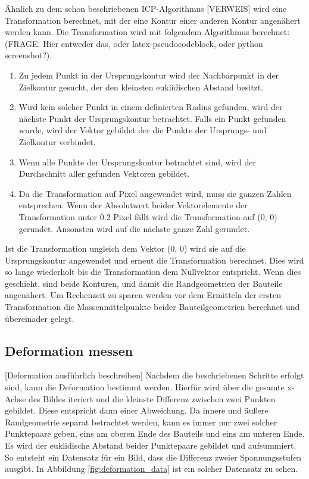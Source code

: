 Ähnlich zu dem schon beschriebenen ICP-Algorithmus [VERWEIS] wird eine Transformation berechnet,
mit der eine Kontur einer anderen Kontur angenähert werden kann.
Die Transformation wird mit folgendem Algorithmus berechnet:
(FRAGE: Hier entweder das, oder latex-pseudocodeblock, oder python screenshot?).

\begin{enumerate}
    \item Zu jedem Punkt in der Ursprungskontur wird der Nachbarpunkt
    in der Zielkontur gesucht, der den kleinsten euklidischen Abstand besitzt.
    \item Wird kein solcher Punkt in einem definierten Radius gefunden,
    wird der nächste Punkt der Ursprungskontur
    betrachtet. Falls ein Punkt gefunden wurde, wird der Vektor gebildet der die Punkte
    der Ursprungs- und Zielkontur verbindet.
    \item Wenn alle Punkte der Ursprungskontur betrachtet sind, wird der 
    Durchschnitt aller gefunden Vektoren gebildet.
    \item Da die Transformation auf Pixel angewendet wird, muss sie ganzen Zahlen 
    entsprechen. Wenn der Absolutwert beider Vektorelemente der Transformation 
    unter 0.2 Pixel fällt wird die Transformation auf (0, 0) gerundet.
    Ansonsten wird auf die nächste ganze Zahl gerundet.
\end{enumerate}

Ist die Transformation ungleich dem Vektor (0, 0) wird sie auf die Ursprungskontur 
angewendet und erneut die Transformation berechnet. Dies wird so lange wiederholt bis 
die Transformation dem Nullvektor entspricht. Wenn dies geschieht, sind beide Konturen, 
und damit die Randgeometrien der Bauteile angenähert.
Um Rechenzeit zu sparen werden vor dem Ermitteln der ersten Transformation die 
Massenmittelpunkte beider Bauteilgeometrien berechnet und übereinader gelegt.

\subsection{Deformation messen}

[Deformation ausführlich beschreiben]
Nachdem die beschriebenen Schritte erfolgt sind, kann die Deformation bestimmt werden.
Hierfür wird über die gesamte x-Achse des Bildes iteriert und die kleinste Differenz 
zwischen zwei Punkten gebildet. Diese entspricht dann einer Abweichung. 
Da innere und äußere Randgeometrie separat betrachtet werden, kann es immer nur zwei
solcher Punktepaare geben, eins am oberen Ende des Bauteils und eins am unteren Ende.
Es wird der euklidische Abstand beider Punktepaare gebildet und aufsummiert.
So entsteht ein Datensatz für ein Bild, 
dass die Differenz zweier Spannungsstufen ausgibt. In Abbildung \ref{fig:deformation_data}
ist ein solcher Datensatz zu sehen. 

